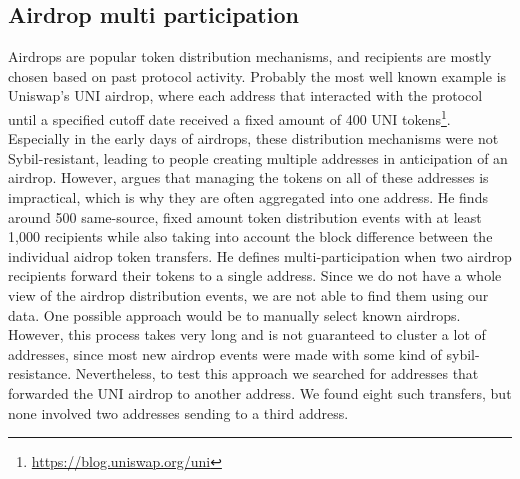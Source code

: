\documentclass[12pt,a4paper,titlepage,oneside,english]{article}
\begin{document}
\subsection{Airdrop multi participation}
Airdrops are popular token distribution mechanisms, and recipients are mostly chosen based on past protocol activity. Probably the most well known example is Uniswap's UNI airdrop, where each address that interacted with the protocol until a specified cutoff date received a fixed amount of 400 UNI tokens\footnote{\url{https://blog.uniswap.org/uni}}. Especially in the early days of airdrops, these distribution mechanisms were not Sybil-resistant, leading to people creating multiple addresses in anticipation of an airdrop. However, \cite{FV:17} argues that managing the tokens on all of these addresses is impractical, which is why they are often aggregated into one address. He finds around 500 same-source, fixed amount token distribution events with at least 1,000 recipients while also taking into account the block difference between the individual aidrop token transfers. He defines multi-participation when two airdrop recipients forward their tokens to a single address. Since we do not have a whole view of the airdrop distribution events, we are not able to find them using our data. One possible approach would be to manually select known airdrops. However, this process takes very long and is not guaranteed to cluster a lot of addresses, since most new airdrop events were made with some kind of sybil-resistance. Nevertheless, to test this approach we searched for addresses that forwarded the UNI airdrop to another address. We found eight such transfers, but none involved two addresses sending to a third address.

\iffalse
Airdrops are a popular mechanism to distribute tokens. On the Ethereum blockchain, they are performed through smart contracts. The owners of the smart contract choose recipients either based on past activity, or ask users to sign up through online forms. Some of these registration processes require users to perform certain actions on social media, such as posting articles or following users. The amount of tokens given to each user is either fixed, or based on existing account balances. If the amount is fixed, there is an incentive to cheat the system. 
We identify Airdrops where a fixed number of tokens is distributed to many recipients. Then we search for addresses that have been forwarded the same amount from the initial recipients. 
This heuristic depends on two inputs. First, a set of aidrops with equal mounts, characterized by a signature of a distributing address, a token network and an amount. Second, the minimum nuber of token aggregations into a single address. The second parameter is trivial to choose, as multi-participation in its smallest form consist of two aidrop recipient addresses forwarding their tokens to a third adddress. In this case, a single entity would be in control of at least 3 addresses.
The main challenge lies in identying airdrops. To do so, we first examine all same-source, fixed amount token distributions.
\fi
\end{document}
